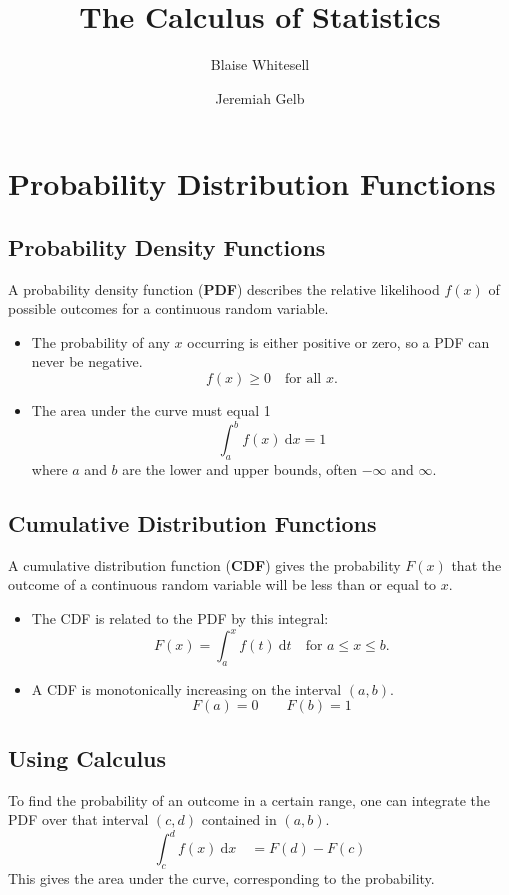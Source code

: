 \documentclass[11pt,leqno,letterpaper]{article}
\title{\Huge{The Calculus of Statistics}}
\author{\Large{Blaise Whitesell} \and \Large{Jeremiah Gelb}}
\begin{document}
\newcommand{\bdef}[1]{\textbf{#1}} %
\newcommand{\dx}{\:\mathrm{d}x} %
\newcommand{\dt}{\:\mathrm{d}t} %
\newcommand{\dth}{\:\mathrm{d}\theta} %
\newcommand{\ddt}{\frac{\mathrm{d}}{\mathrm{d}t}} %
\theoremstyle{definition} \newtheorem{problem}{Problem}
\newcommand{\psep}{\hrule } %
\newcommand{\AM}{\textsc{am}}
\maketitle
\thispagestyle{fancy}
\vspace{2 em}
\section{Probability Distribution Functions}
\subsection{Probability Density Functions}
A probability density function (\bdef{PDF}) describes
the relative likelihood $f(x)$ of possible outcomes
for a continuous random variable.
\begin{itemize}
\item The probability of any $x$ occurring is either positive or zero,
so a PDF can never be negative.
\[
f(x) \geq 0 \quad \text{for all }x.
\]
\item The area under the curve must equal 1
\[
\int_a^b f(x)\dx = 1
\]
where $a$ and $b$ are the lower and upper bounds,
often $-\infty$ and $\infty$.
\end{itemize}
\subsection{Cumulative Distribution Functions}
A cumulative distribution function (\bdef{CDF}) gives
the probability $F(x)$ that the outcome of a
continuous random variable will be less than or equal to $x$.
\begin{itemize}
\item The CDF is related to the PDF by this integral:
\[
F(x) = \int_a^x f(t) \dt \quad \text{for } a \leq x \leq b.
\]
\item A CDF is monotonically increasing on the interval $(a,b)$.
\[
F(a) = 0 \qquad F(b) = 1
\]
\end{itemize}
\subsection{Using Calculus}
To find the probability of an outcome in a certain range,
one can integrate the PDF over that interval
$(c,d)$ contained in $(a,b)$.
\[
\int_c^d f(x) \dx \quad = F(d) - F(c)
\]
This gives the area under the curve, corresponding to the probability.
\end{document}
